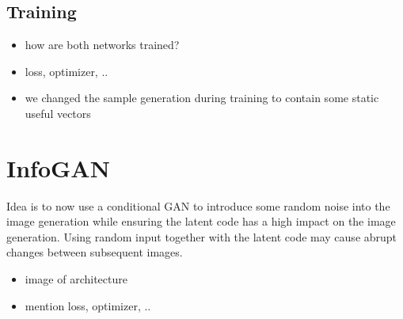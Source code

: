         \subsection{Training}
            \begin{itemize}
                \item how are both networks trained?
                \item loss, optimizer, ..
                \item we changed the sample generation during training to contain some static useful vectors
            \end{itemize}

    \section{InfoGAN}
        Idea is to now use a conditional GAN to introduce some random noise into the image generation while ensuring the latent code has a high impact on the image generation. Using random input together with the latent code may cause abrupt changes between subsequent images.
        \begin{itemize}
            \item image of architecture
            \item mention loss, optimizer, ..
        \end{itemize}
